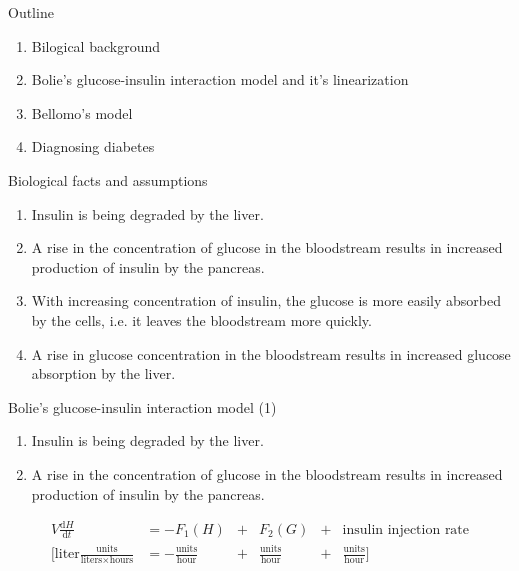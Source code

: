 \documentclass{beamer}
\providecommand{\m}[1]{\ensuremath{\mathrm{#1}}}
\begin{document}
\begin{frame}{Outline}
\begin{enumerate}
 \item Bilogical background
 \item Bolie's glucose-insulin interaction model and it's linearization
 \item Bellomo's model
 \item Diagnosing diabetes
\end{enumerate}


\end{frame}

\begin{frame}{Biological facts and assumptions}
\begin{enumerate}
	\item
	Insulin is being degraded by the liver.	
	\item
	A rise in the concentration of glucose in the bloodstream results in increased production of insulin by the pancreas.
	\item
	With increasing concentration of insulin, the glucose is more easily absorbed by the cells, i.e. it leaves the bloodstream more quickly.
	\item
	A rise in glucose concentration in the bloodstream results in increased glucose absorption by the liver.

\end{enumerate}
\end{frame}

\begin{frame}{Bolie's glucose-insulin interaction model (1)}

\begin{enumerate}
	\item
	Insulin is being degraded by the liver.	
	\item
	A rise in the concentration of glucose in the 			bloodstream results in increased production of 			insulin by the pancreas.
\end{enumerate}

\begin{align*}
V\frac{\m{d} H}{\m{d} t}&=-F_1(H)&+&F_2(G)&+ &\text{insulin injection rate}\\
\Bigg[\text{liter}\frac{\text{units}}{\text{liters} \times\text{hours}}&=-\frac{\text{units}}{\text{hour}}&+&\frac{\text{units}}{\text{hour}}&+&\frac{\text{units}}{\text{hour}}\Bigg]
\end{align*}



\end{frame}
\end{document}

